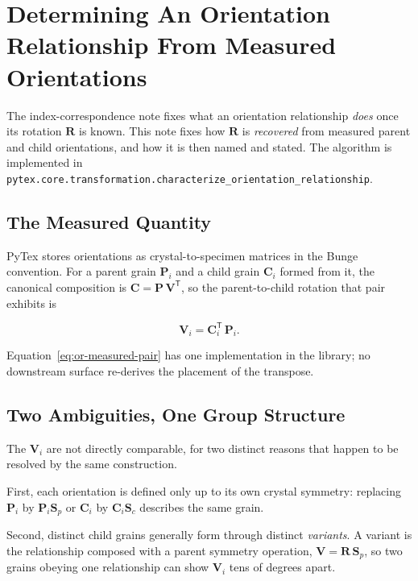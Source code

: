 \section{Determining An Orientation Relationship From Measured Orientations}

The index-correspondence note fixes what an orientation relationship \emph{does} once its
rotation $\mathbf{R}$ is known. This note fixes how $\mathbf{R}$ is \emph{recovered} from
measured parent and child orientations, and how it is then named and stated. The algorithm is
implemented in \texttt{pytex.core.transformation.characterize\_orientation\_relationship}.

\subsection{The Measured Quantity}

PyTex stores orientations as crystal-to-specimen matrices in the Bunge convention. For a parent
grain $\mathbf{P}_{i}$ and a child grain $\mathbf{C}_{i}$ formed from it, the canonical
composition is $\mathbf{C} = \mathbf{P}\,\mathbf{V}^{\mathsf{T}}$, so the parent-to-child
rotation that pair exhibits is

\begin{equation}
\mathbf{V}_{i} = \mathbf{C}_{i}^{\mathsf{T}}\,\mathbf{P}_{i}.
\label{eq:or-measured-pair}
\end{equation}

Equation~\eqref{eq:or-measured-pair} has one implementation in the library; no downstream surface
re-derives the placement of the transpose.

\subsection{Two Ambiguities, One Group Structure}

The $\mathbf{V}_{i}$ are not directly comparable, for two distinct reasons that happen to be
resolved by the same construction.

First, each orientation is defined only up to its own crystal symmetry: replacing
$\mathbf{P}_{i}$ by $\mathbf{P}_{i}\mathbf{S}_{p}$ or $\mathbf{C}_{i}$ by
$\mathbf{C}_{i}\mathbf{S}_{c}$ describes the same grain.

Second, distinct child grains generally form through distinct \emph{variants}. A variant is the
relationship composed with a parent symmetry operation, $\mathbf{V} = \mathbf{R}\,\mathbf{S}_{p}$,
so two grains obeying one relationship can show $\mathbf{V}_{i}$ tens of degrees apart.

